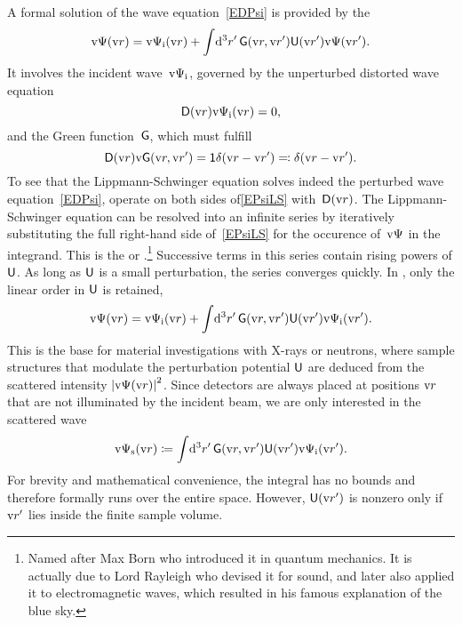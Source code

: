A formal solution of the wave equation~\cref{EDPsi} is provided
by the 
%
\begin{equation}\label{EPsiLS}
  \text{v}\Psi(\text{v}{r})
  = \text{v}\Psi_{\text{i}}(\text{v}{r})
  + \int\!\mathrm d^3r'\, \mathsf{G}(\text{v}{r},\text{v}{r}') \mathsf{U}(\text{v}{r}')\text{v}\Psi(\text{v}{r}').
\end{equation}
It involves the incident wave~$\text{v}\Psi_{\text{i}}$, governed by the unperturbed distorted wave equation
%
%
%
%
%
%
\begin{equation}\label{EDPsii}
  \mathsf{D}(\text{v}{r})\text{v}\Psi_{\text{i}}(\text{v}{r}) = 0,
\end{equation}
and the Green function~$\mathsf{G}$,
%
%
which must fulfill
\begin{equation}\label{EGREEN}
  \mathsf{D}(\text{v}{r})\text{v}\mathsf{G}(\text{v}{r},\text{v}{r}') = \mathsf{1} \delta(\text{v}{r}-\text{v}{r}') \eqqcolon \mathsf{\delta}(\text{v}{r}-\text{v}{r}').
\end{equation}
To see that the Lippmann-Schwinger equation solves indeed the perturbed wave equation~\cref{EDPsi},
operate on both sides of\cref{EPsiLS} with~$\mathsf{D}(\text{v}{r})$.
The Lippmann-Schwinger equation can be resolved into an infinite series
by iteratively substituting the full right-hand side of~\cref{EPsiLS}
for the occurence of~$\text{v}\Psi$ in the integrand.
%
%
This is the  or .\footnote
{Named after Max Born who introduced it in quantum mechanics.
It is actually due to Lord Rayleigh who devised it for sound,
and later also applied it to electromagnetic waves,
which resulted in his famous explanation of the blue sky.}
Successive terms in this series contain rising powers of $\mathsf{U}$.
As long as $\mathsf{U}$ is a small perturbation, the series converges quickly.
In ,
%
only the linear order in $\mathsf{U}$ is retained,
\begin{equation}\label{EBorn}
  \text{v}\Psi(\text{v}{r})
  = \text{v}\Psi_{\text{i}}(\text{v}{r})
  + \int\!\mathrm d^3r'\, \mathsf{G}(\text{v}{r},\text{v}{r}') \mathsf{U}(\text{v}{r}')\text{v}\Psi_{\text{i}}(\text{v}{r}').
\end{equation}
This is the base for material investigations with X-rays or neutrons,
where sample structures that modulate the perturbation potential $\mathsf{U}$
are deduced from the scattered intensity ${|\text{v}\Psi(\text{v}{r})|}^2$.
Since detectors are always placed at positions $\text{v}{r}$
that are not illuminated by the incident beam,
we are only interested in the scattered wave
%
%
\begin{equation}\label{EBornS}
  \text{v}\Psi_\text{s}(\text{v}{r})
  \coloneqq
  \int\!\mathrm d^3r'\, \mathsf{G}(\text{v}{r},\text{v}{r}') \mathsf{U}(\text{v}{r}') \text{v}\Psi_{\text{i}}(\text{v}{r}').
\end{equation}
%
%
For brevity and mathematical convenience,
the integral has no bounds
and therefore formally runs over the entire space.
However, $\mathsf{U}(\text{v}{r}')$ is nonzero only if $\text{v}{r}'$ lies inside the finite sample volume.


